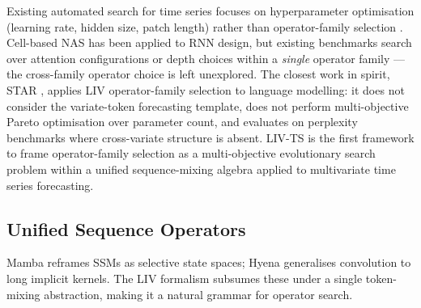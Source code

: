 Existing automated search for time series focuses on hyperparameter optimisation (learning rate, hidden size, patch length) rather than operator-family selection \cite{elsken2019neural}.
Cell-based NAS \cite{zoph2017neural} has been applied to RNN design, but existing benchmarks search over attention configurations or depth choices within a \emph{single} operator family — the cross-family operator choice is left unexplored.
The closest work in spirit, STAR \cite{thomas2024star}, applies LIV operator-family selection to language modelling: it does not consider the variate-token forecasting template, does not perform multi-objective Pareto optimisation over parameter count, and evaluates on perplexity benchmarks where cross-variate structure is absent.
LIV-TS is the first framework to frame operator-family selection as a multi-objective evolutionary search problem within a unified sequence-mixing algebra applied to multivariate time series forecasting.

\subsection{Unified Sequence Operators}

Mamba \cite{gu2023mamba} reframes SSMs as selective state spaces; Hyena \cite{poli2023hyena} generalises convolution to long implicit kernels.
The LIV formalism \cite{thomas2024star,massaroli2024liv} subsumes these under a single token-mixing abstraction, making it a natural grammar for operator search.

